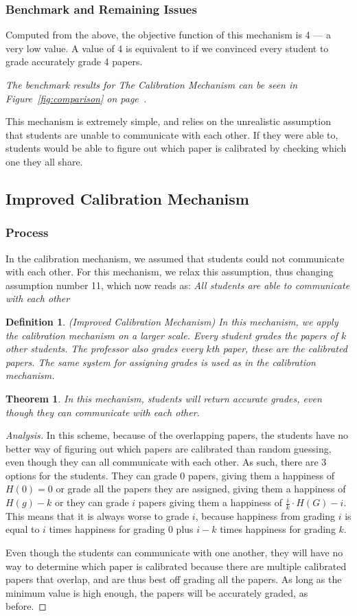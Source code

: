 \documentclass[12pt, Arial]{article}
\newtheorem{theorem}{Theorem}
\newtheorem{definition}{Definition}
\begin{document}
\subsubsection{Benchmark and Remaining Issues}
Computed from the above, the objective function of this mechanism is 4 --- a very low value. A value of 4 is equivalent to if we convinced every student to grade accurately grade 4 papers.

\emph{The benchmark results for The Calibration Mechanism can be seen in Figure~\ref{fig:comparison} on page~\pageref{fig:comparison}.}

This mechanism is extremely simple, and relies on the unrealistic assumption that students are unable to communicate with each other. If they were able to, students would be able to figure out which paper is calibrated by checking which one they all share.

\subsection{Improved Calibration Mechanism}
\subsubsection{Process}
In the calibration mechanism, we assumed that students could not communicate with each other. For this mechanism, we relax this assumption, thus changing assumption number 11, which now reads as: \emph{All students are able to communicate with each other}
\begin{definition}(Improved Calibration Mechanism)
In this mechanism, we apply the calibration mechanism on a larger scale. Every student grades the papers of $k$ other students. The professor also grades every $k$th paper, these are the calibrated papers. The same system for assigning grades is used as in the calibration mechanism.
\end{definition}
\begin{theorem}
In this mechanism, students will return accurate grades, even though they can communicate with each other.
\end{theorem}
\begin{proof}[Analysis]
In this scheme, because of the overlapping papers, the students have no better way of figuring out which papers are calibrated than random guessing, even though they can all communicate with each other. As such, there are 3 options for the students. They can grade 0 papers, giving them a happiness of $H(0) = 0$ or grade all the papers they are assigned, giving them a happiness of $H(g) - k$ or they can grade $i$ papers giving them a happiness of $\frac{i}{k} \cdot H(G)-i$. This means that it is always worse to grade $i$, because happiness from grading $i$ is equal to $i$ times happiness for grading 0 plus $i-k$ times happiness for grading $k$.

Even though the students can communicate with one another, they will have no way to determine which paper is calibrated because there are multiple calibrated papers that overlap, and are thus best off grading all the papers. As long as the minimum value is high enough, the papers will be accurately graded, as before.
\end{proof}
\end{document}

